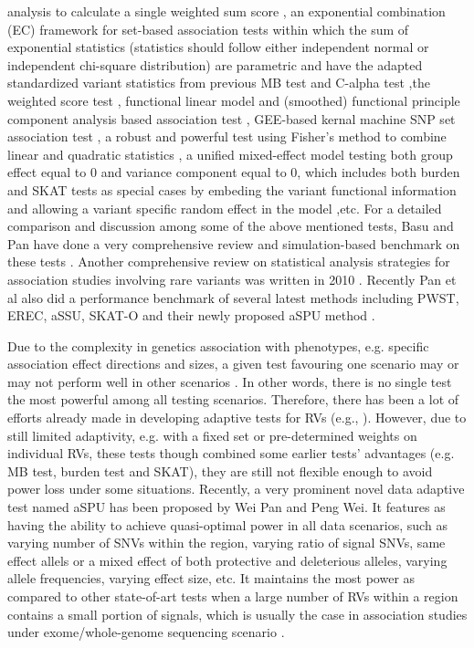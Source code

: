 \documentclass[12pt]{article}
\begin{document}
analysis to calculate a single weighted sum score \cite{Zhang2011}, an exponential combination (EC) framework for set-based association tests within which the sum of exponential statistics (statistics should follow either independent normal or independent chi-square distribution) are parametric and have the adapted standardized variant statistics from previous MB test and C-alpha test \cite{Chen2012},the weighted score test \cite{Cai2012}, functional linear model and (smoothed) functional principle component analysis based association test \cite{Luo2011,Luo2012, Luo2012a,Fan2013}, GEE-based kernal machine SNP set association test \cite{Wang2013}, a robust and powerful test using Fisher's method to combine linear and quadratic statistics \cite{Derkach2013}, a unified mixed-effect model testing both group effect equal to 0 and variance component equal to 0, which includes both burden and SKAT tests as special cases by embeding the variant functional information and allowing a variant specific random effect in the model \cite{Sun2013},etc. For a detailed comparison and discussion among some of the above mentioned tests, Basu and Pan have done a very comprehensive review and simulation-based benchmark on these tests \cite{Basu2011}. Another comprehensive review on statistical analysis strategies for association studies involving rare variants was written in 2010 \cite{Bansal2010}. Recently Pan et al also did a performance benchmark of several latest methods including PWST, EREC, aSSU, SKAT-O and their newly proposed aSPU method \cite{pan2014powerful}.

Due to the complexity in genetics association with phenotypes, e.g. specific association effect directions and sizes, a given test favouring one scenario may or may not perform well in other scenarios \cite{Pan2009,Derkach2013,pan2014powerful,Sun2013}. In other words, there is no single test the most powerful among all testing scenarios. Therefore, there has been a lot of efforts already made in developing adaptive tests for RVs (e.g., \cite{Derkach2013,Chen2012,Han2010,Lee2012,Lin2011,Pan2011,Sun2013,Zhang2011}). However, due to still limited adaptivity, e.g. with a fixed set or pre-determined weights on individual RVs, these tests though combined some earlier tests' advantages (e.g. MB test, burden test and SKAT), they are still not flexible enough to avoid power loss under some situations. Recently, a very prominent novel data adaptive test named aSPU has been proposed by Wei Pan and Peng Wei\cite{pan2014powerful}. It features as having the ability to achieve quasi-optimal power in all data scenarios, such as varying number of SNVs within the region, varying ratio of signal SNVs, same effect allels or a mixed effect of both protective and deleterious alleles, varying allele frequencies, varying effect size, etc. It maintains the most power as compared to other state-of-art tests when a large number of RVs within a region contains a small portion of signals, which is usually the case in association studies under exome/whole-genome sequencing scenario \cite{pan2014powerful}.
\end{document}
